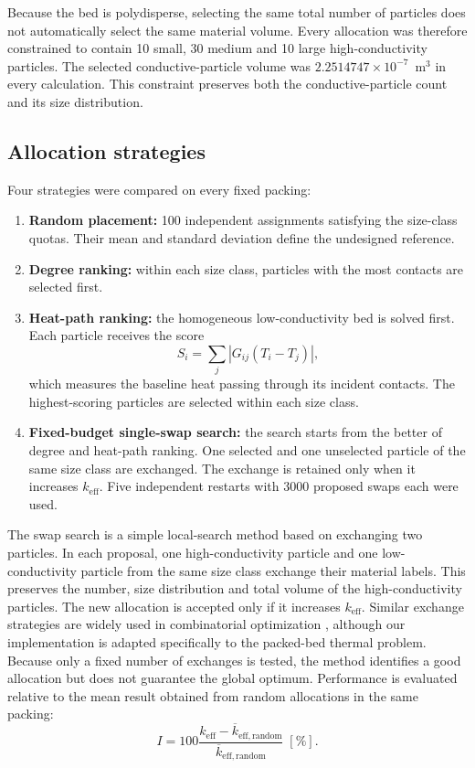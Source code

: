 \documentclass[12pt,a4paper]{article}
\begin{document}
	Because the bed is polydisperse, selecting the same total number of particles
	does not automatically select the same material volume. Every allocation was
	therefore constrained to contain 10 small, 30 medium and 10 large
	high-conductivity particles. The selected conductive-particle volume was
	$2.2514747\times10^{-7}$~m$^3$ in every calculation. This constraint preserves
	both the conductive-particle count and its size distribution.
	
	\subsection{Allocation strategies}
	
	Four strategies were compared on every fixed packing:
	
	\begin{enumerate}
		\item \textbf{Random placement:} 100 independent assignments satisfying the
		size-class quotas. Their mean and standard deviation define the undesigned
		reference.
		\item \textbf{Degree ranking:} within each size class, particles with the most
		contacts are selected first.
		\item \textbf{Heat-path ranking:} the homogeneous low-conductivity bed is
		solved first. Each particle receives the score
		\begin{equation}
			S_i=\sum_j\left|G_{ij}(T_i-T_j)\right|,
		\end{equation}
		which measures the baseline heat passing through its incident contacts. The
		highest-scoring particles are selected within each size class.
		\item \textbf{Fixed-budget single-swap search:} the search starts from the
		better of degree and heat-path ranking. One selected and one unselected
		particle of the same size class are exchanged. The exchange is retained only
		when it increases $k_{\mathrm{eff}}$. Five independent restarts with 3000
		proposed swaps each were used.
	\end{enumerate}
	The swap search is a simple local-search method based on exchanging two
	particles. In each proposal, one high-conductivity particle and one
	low-conductivity particle from the same size class exchange their material
	labels. This preserves the number, size distribution and total volume of the
	high-conductivity particles. The new allocation is accepted only if it
	increases $k_{\mathrm{eff}}$. Similar exchange strategies are widely used in
	combinatorial optimization
	\cite{KernighanLin1970,Maringer2003}, although our implementation is adapted
	specifically to the packed-bed thermal problem. Because only a fixed number of
	exchanges is tested, the method identifies a good allocation but does not
	guarantee the global optimum. Performance is evaluated relative to the mean
	result obtained from random allocations in the same packing:
	\begin{equation}
		I=100\frac{k_{\mathrm{eff}}-\overline{k}_{\mathrm{eff,random}}}
		{\overline{k}_{\mathrm{eff,random}}}\;[\%].
		\label{eq:improvement}
	\end{equation}
	
\end{document}
